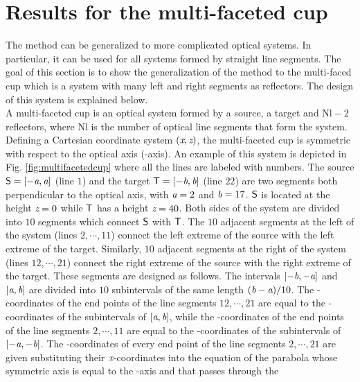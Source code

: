 \section{Results for the multi-faceted cup}


\label{sec:Generalization}
The method can be generalized to more complicated optical systems.
In particular, it can be used for all systems formed by straight line segments.
The goal of this section is to show the generalization of the method to the multi-faced cup which is a system with many left and right segments as reflectors.
The design of this system is explained below. \\ \indent
A multi-faceted cup is an optical system formed by a source, a target and $\textrm{Nl}-2$ reflectors, where \textrm{Nl} is the number of optical line segments that form the system.
Defining a Cartesian coordinate system $(\textit{x}, \textit{z})$, the multi-faceted cup is symmetric with respect to the optical axis (-axis). An example of this system is depicted in Fig. \ref{fig:multifacetedcup} where all the lines are labeled with numbers.
The source $\textsf{S}= [-\textit{a}, \textit{a}]$ (line $1$) and the target $\textsf{T}= [-\textit{b}, \textit{b}]$ (line $22$) are two segments both perpendicular to the optical axis, with $\textit{a}=2$ and $\textit{b}=17$.
$\textsf{S}$ is located at the height $\textit{z}=0$ while $\textsf{T}$ has a height $\textit{z}=40$.
Both sides of the system are divided into $10$ segments which connect $\textsf{S}$ with $\textsf{T}$.
The $10$ adjacent segments at the left of the system (lines $2, \cdots, 11$) connect the left extreme of the source with the left extreme of the target.
Similarly, $10$ adjacent segments at the right of the system (lines $12, \cdots, 21$) connect the right extreme of the source with the right extreme of the target.
These segments are designed as follows. The intervals $[-\textit{b}, -\textit{a}]$ and $[\textit{a}, \textit{b}]$ are divided into $10$ subintervals of the same length $(\textit{b}-\textit{a})/10$.
The -coordinates of the end points of the line segments $12, \cdots, 21$ are equal to the -coordinates of the subintervals of $[\textit{a},\textit{b}]$, while the -coordinates of the end points of the line segments $2, \cdots, 11$ are equal to the -coordinates of the subintervals of $[-\textit{a},-\textit{b}]$.
The -coordinates of every end point of the line segments $2, \cdots, 21$  are given substituting their $\textit{x}$-coordinates into the equation of the parabola whose symmetric axis is equal to the -axis and that passes through the
